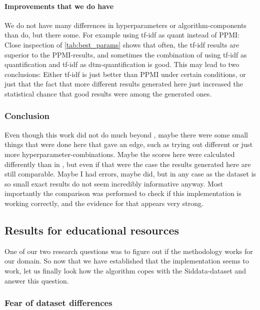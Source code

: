 \paragraph{Improvements that we do have}

We do not have many differences in hyperparameters or algorithm-components than \mainalgos do, but there some. For example using tf-idf as \gls{quant} instead of PPMI: Close inspection of \autoref{tab:best_params} shows that often, the tf-idf results are superior to the PPMI-results, and sometimes the combination of using tf-idf as quantification and tf-idf as dtm-quantification is good. This may lead to two conclusions: Either tf-idf is just better than PPMI under certain conditions, or just that the fact that more different results generated here just increased the statistical chance that good results were among the generated ones.

\subsubsection*{Conclusion} 

Even though this work did not do much beyond \mainalgos, maybe there were some small things that were done here that gave an edge, such as trying out different or just more hyperparameter-combinations. Maybe the scores here were calculated differently than in \mainalgos, but even if that were the case the results generated here are still comparable. Maybe I had errors, maybe \mainalgos did, but in any case as the dataset is so small exact results do not seem incredibly informative anyway. Most importantly the comparison was performed to check if this implementation is working correctly, and the evidence for that appears very strong.

\subsection{Results for educational resources}

One of our two research questions was to figure out if the methodology works for our domain. So now that we have established that the implementation seems to work, let us finally look how the algorithm copes with the Siddata-dataset and answer this question.

\subsubsection{Fear of dataset differences}
\label{sec:discuss_datasetdiffs}

